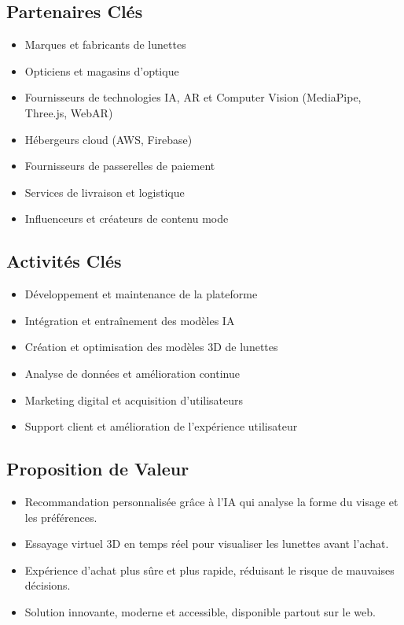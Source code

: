 \subsection{Partenaires Clés}
\begin{itemize}
    \item Marques et fabricants de lunettes
    \item Opticiens et magasins d'optique
    \item Fournisseurs de technologies IA, AR et Computer Vision (MediaPipe, Three.js, WebAR)
    \item Hébergeurs cloud (AWS, Firebase)
    \item Fournisseurs de passerelles de paiement
    \item Services de livraison et logistique
    \item Influenceurs et créateurs de contenu mode
\end{itemize}

\subsection{Activités Clés}
\begin{itemize}
    \item Développement et maintenance de la plateforme
    \item Intégration et entraînement des modèles IA
    \item Création et optimisation des modèles 3D de lunettes
    \item Analyse de données et amélioration continue
    \item Marketing digital et acquisition d'utilisateurs
    \item Support client et amélioration de l'expérience utilisateur
\end{itemize}

\subsection{Proposition de Valeur}
\begin{itemize}
    \item Recommandation personnalisée grâce à l'IA qui analyse la forme du visage et les préférences.
    \item Essayage virtuel 3D en temps réel pour visualiser les lunettes avant l'achat.
    \item Expérience d'achat plus sûre et plus rapide, réduisant le risque de mauvaises décisions.
    \item Solution innovante, moderne et accessible, disponible partout sur le web.
\end{itemize}


